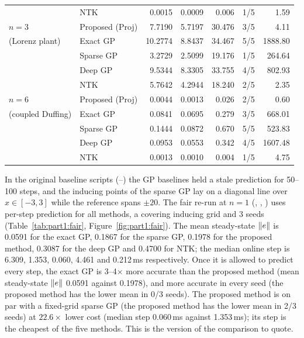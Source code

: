 \begin{table}[htbp]
\begin{tabular}{@{}llrrrcr@{}}
 & NTK & 0.0015 & 0.0009 & 0.006 & 1/5 & 1.59\\
\addlinespace
$n=3$ & Proposed (Proj) & 7.7190 & 5.7197 & 30.476 & 3/5 & 4.11\\
\quad (Lorenz plant) & Exact GP & 10.2774 & 8.8437 & 34.467 & 5/5 & 1888.80\\
 & Sparse GP & 3.2729 & 2.5099 & 19.176 & 1/5 & 264.64\\
 & Deep GP & 9.5344 & 8.3305 & 33.755 & 4/5 & 802.93\\
 & NTK & 5.7642 & 4.2944 & 18.240 & 2/5 & 2.35\\
\addlinespace
$n=6$ & Proposed (Proj) & 0.0044 & 0.0013 & 0.026 & 2/5 & 0.60\\
\quad (coupled Duffing) & Exact GP & 0.0841 & 0.0695 & 0.279 & 3/5 & 668.01\\
 & Sparse GP & 0.1444 & 0.0872 & 0.670 & 5/5 & 523.83\\
 & Deep GP & 0.0953 & 0.0553 & 0.342 & 4/5 & 1607.48\\
 & NTK & 0.0013 & 0.0010 & 0.004 & 1/5 & 4.75\\
\bottomrule
\end{tabular}
\end{table}

In the original baseline scripts (--) the GP baselines held a stale prediction for 50--100 steps,
and the inducing points of the sparse GP lay on a diagonal line over $x\in[-3,3]$ while the reference spans $\pm20$.
The fair re-run at $n=1$ (, ,
) uses per-step prediction for all methods, a covering inducing grid and 3 seeds
(Table~\ref{tab:part1:fair}, Figure~\ref{fig:part1:fair}). The mean steady-state $\lVert e\rVert$ is 0.0591 for the exact
GP, 0.1867 for the sparse GP, 0.1978 for the proposed method, 0.3087 for the deep GP and 0.4700 for NTK; the median
online step is 6.309, 1.353, 0.060, 4.461 and 0.212\,ms respectively. Once it is allowed to predict every step, the
exact GP is 3--4$\times$ more accurate than the proposed method (mean steady-state $\lVert e\rVert$ 0.0591 against 0.1978),
and more accurate in every seed (the proposed method has the lower mean in 0/3 seeds). The proposed method is on par
with a fixed-grid sparse GP (the proposed method has the lower mean in 2/3 seeds) at $22.6\times$ lower cost (median
step 0.060\,ms against 1.353\,ms); its step is the cheapest of the five methods. This is the version of the comparison to quote.

